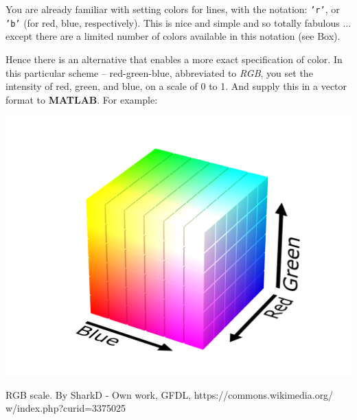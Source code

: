 \documentclass{tufte-book} %
\begin{document}
You are already familiar with setting colors for lines, with the notation: \texttt{'r'}, or \texttt{'b'} (for red, blue, respectively). This is nice and simple and so totally fabulous ... except there are a limited number of colors available in this notation (see Box).


Hence there is an alternative that enables a more exact specification of color. In this particular scheme -- red-green-blue, abbreviated to \textit{RGB}, you set the intensity of red, green, and blue, on a scale of 0 to 1. And supply this in a vector format to \textbf{MATLAB}. For example:

\begin{marginfigure}[-0.0in]
\includegraphics[width=\linewidth]{RGB_color_solid_cube.png}
\caption{RGB scale. By SharkD - Own work, GFDL, https://commons.wikimedia.org/
w/index.php?curid=3375025}
\label{fig:RGB_color_solid_cube}
\end{marginfigure}
\end{document}
